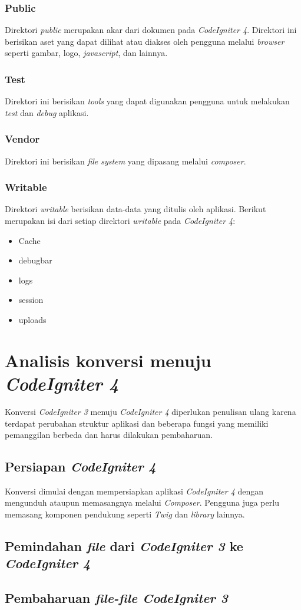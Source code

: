 \subsubsection{Public}
Direktori \textit{public} merupakan akar dari dokumen pada \textit{CodeIgniter 4}. Direktori ini berisikan aset yang dapat dilihat atau diakses oleh pengguna melalui \textit{browser} seperti gambar, logo, \textit{javascript}, dan lainnya.

\subsubsection{Test}
Direktori ini berisikan \textit{tools} yang dapat digunakan pengguna untuk melakukan \textit{test} dan \textit{debug} aplikasi.
\subsubsection{Vendor}
Direktori ini berisikan \textit{file system} yang dipasang melalui \textit{composer}. 
\subsubsection{Writable}
Direktori \textit{writable} berisikan data-data yang ditulis oleh aplikasi. Berikut merupakan isi dari setiap direktori \textit{writable} pada \textit{CodeIgniter 4}:
\begin{itemize}
\item Cache
\item debugbar
\item logs
\item session
\item uploads
\end{itemize}

\section{Analisis konversi menuju \textit{CodeIgniter 4}}
Konversi \textit{CodeIgniter 3} menuju \textit{CodeIgniter 4} diperlukan penulisan ulang karena terdapat perubahan struktur aplikasi dan beberapa fungsi yang memiliki pemanggilan berbeda dan harus dilakukan pembaharuan.
\subsection{Persiapan \textit{CodeIgniter 4}} Konversi dimulai dengan mempersiapkan aplikasi \textit{CodeIgniter 4} dengan mengunduh ataupun memasangnya melalui \textit{Composer}. Pengguna juga perlu memasang komponen pendukung seperti \textit{Twig} dan \textit{library} lainnya.
\subsection{Pemindahan \textit{file} dari \textit{CodeIgniter 3} ke \textit{CodeIgniter 4}}


\subsection{Pembaharuan \textit{file-file CodeIgniter 3} }